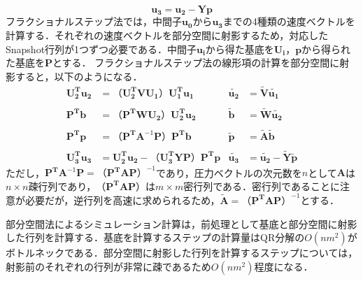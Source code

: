 \documentclass[a4j,12pt]{jreport}
\begin{document}
\[
	\bm{u_3}  =  \bm{u_2} - \mathbf{Y}\bm{p} 
\]
フラクショナルステップ法では，中間子$\bm{u_0}$から$\bm{u_3}$までの4種類の速度ベクトルを計算する．それぞれの速度ベクトルを部分空間に射影するため，対応したSnapshot行列が1つずつ必要である．中間子$\bm{u_i}$から得た基底を$\mathbf{U_i}$，$\bm{p}$から得られた基底を$\mathbf{P}$とする．
フラクショナルステップ法の線形項の計算を部分空間に射影すると，以下のようになる．
\begin{align*}
 \mathbf{U_2^T}\bm{u_2}	& = （\mathbf{U_2^T}\mathbf{V}\mathbf{U_1}）\mathbf{U_1^T}\bm{u_1} 					&\bm{\tilde{u_2}} 		&= \mathbf{\tilde{V}}\bm{\tilde{u_1}}	\\
 &&&\\
 \mathbf{P^T}\bm{b}		& = （\mathbf{P^T}\mathbf{W}\mathbf{U_2}）\mathbf{U_2^T}\bm{u_2}        				&\bm{\tilde{b}}			&= \mathbf{\tilde{W}}\bm{\tilde{u_2}}	\\
  &&&\\
 \mathbf{P^T}\bm{p} 		&= （\mathbf{P^T}\mathbf{A}^{-1}\mathbf{P}）\mathbf{P^T}\bm{b}						&\bm{\tilde{p}}			&= \mathbf{\tilde{A}}\bm{\tilde{b}}\\
   &&&\\
 \mathbf{U_3^T}\bm{u_3} 	&=  \mathbf{U_2^T}\bm{u_2} - （\mathbf{U_3^T}\mathbf{Y}\mathbf{P}）\mathbf{P^T}\bm{p}	&\bm{\tilde{u_3}}		&= \bm{\tilde{u_2}}  -  \mathbf{\tilde{Y}}\bm{\tilde{p}}
\end{align*}
ただし，$\mathbf{P^T}\mathbf{A}^{-1}\mathbf{P} = （\mathbf{P^T}\mathbf{A}\mathbf{P}）^{-1}$であり，圧力ベクトルの次元数を$n$として$\mathbf{A}$は$n\times n$疎行列であり，$（\mathbf{P^T}\mathbf{A}\mathbf{P}）$は$m\times m$密行列である．密行列であることに注意が必要だが，逆行列を高速に求められるため，$\mathbf{\tilde{A}} = （\mathbf{P^T}\mathbf{A}\mathbf{P}）^{-1}$とする．

部分空間法によるシミュレーション計算は，前処理として基底と部分空間に射影した行列を計算する．基底を計算するステップの計算量はQR分解の$O(nm^2)$がボトルネックである．部分空間に射影した行列を計算するステップについては，射影前のそれぞれの行列が非常に疎であるため$O(nm^2)$程度になる．
\end{document}
